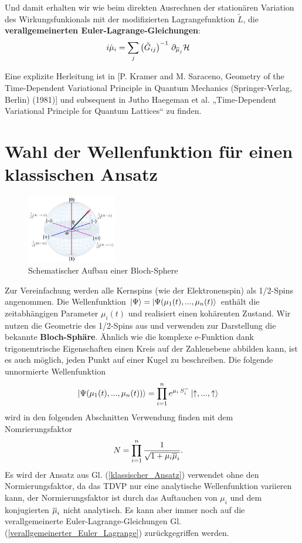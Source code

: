 Und damit erhalten wir wie beim direkten Ausrechnen der stationären Variation des Wirkungsfunkionals mit der modifizierten 
Lagrangefunktion $\widetilde{L}$, die \textbf{verallgemeinerten Euler-Lagrange-Gleichungen}:
\begin{align}\label{verallgemeinerter_Euler_Lagrange}
    i\dot{\mu}_i &= \sum_{j}\left(\tilde{G}_{ij}\right)^{-1}\thinspace \partial_{\overline{\mu}_j}\mathcal{{H}}
\end{align}

Eine explizite Herleitung ist in [P. Kramer and M. Saraceno, Geometry of the Time-Dependent Variational Principle in Quantum Mechanics
(Springer-Verlag, Berlin) (1981)]\cite{noauthor_2008-dn} und subsequent in Jutho Haegeman et 
al. „Time-Dependent Variational Principle for Quantum Lattices“\cite{Haegeman_2011} zu finden.
\section{Wahl der Wellenfunktion für einen klassischen Ansatz}
\begin{figure}
    \centering
    \includegraphics[width = 0.35\textwidth]{Abbildungen/bloch-sphere.png}
    \caption{Schematischer Aufbau einer Bloch-Sphere}
    \label{fig:qubit}
\end{figure}
Zur Vereinfachung werden alle Kernspins (wie der Elektronenspin) als 1/2-Spins angenommen. 
Die Wellenfunktion $\ket{\Psi}=\ket{\Psi(\mu_1(t),...,\mu_n(t)}$ enthält die zeitabhängigen Parameter $\mu_i(t)$ und realisiert einen 
kohärenten Zustand. Wir nutzen die Geometrie des 1/2-Spins aus und verwenden zur Darstellung die bekannte \textbf{Bloch-Sphäre}. 
Ähnlich wie die komplexe e-Funktion dank trigonemtrische Eigenschaften einen Kreis auf der Zahlenebene abbilden kann, ist es auch möglich,
jeden Punkt auf einer Kugel zu beschreiben. Die folgende unnormierte Wellenfunktion 
\begin{align}\label{klassischer_Ansatz}
    \ket{\Psi(\mu_1(t),...,\mu_n(t))} &= \prod_{i=1}^{n} e^{\mu_i\thinspace S_i^-}\ket{\uparrow,...,\uparrow}
\end{align}
wird in den folgenden Abschnitten Verwendung finden mit dem Nomrierungsfaktor
\begin{align}
    N &= \prod_{i=1}^{n} \frac{1}{\sqrt{1+\mu_i\overline{\mu}_i}}.
\end{align}
Es wird der Ansatz aus Gl. (\ref{klassischer_Ansatz}) verwendet ohne den Normierungsfaktor, da das TDVP nur eine analytische Wellenfunktion variieren kann,
der Normierungsfaktor ist durch das Auftauchen von $\mu_i$ und dem konjugierten $\overline{\mu}_i$ nicht analytisch. Es kann aber immer noch auf die 
verallgemeinerte Euler-Lagrange-Gleichungen Gl. (\ref{verallgemeinerter_Euler_Lagrange}) zurückgegriffen werden.
